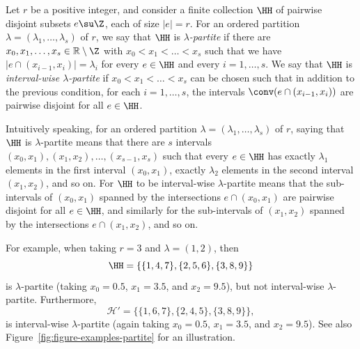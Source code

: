 \begin{definition}\label{def-s-partite}
    Let $r$ be a positive integer, and consider a finite collection $\HH$ of pairwise disjoint subsets $e\su \Z$, each of size $|e|=r$. For an ordered partition $\lambda=(\lambda_1,\dots,\lambda_s)$ of $r$, we say that $\HH$ is \emph{$\lambda$-partite} if there are $x_0,x_1,\dots,x_{s}\in\mathbb{R}\setminus\Z$ with $x_0<x_1<\dots<x_{s}$ such that we have $|e\cap (x_{i-1},x_i)|=\lambda_i$ for every $e\in \HH$ and every $i=1,\dots,s$. We say that $\HH$ is \emph{interval-wise $\lambda$-partite} if $x_0<x_1<\dots<x_{s}$ can be chosen such that in addition to the previous condition, for each $i=1,\dots,s$, the intervals $\conv(e\cap (x_{i-1},x_i))$  are pairwise disjoint for all $e\in \HH$.
\end{definition}

Intuitively speaking, for an ordered partition $\lambda=(\lambda_1,\dots,\lambda_s)$ of $r$, saying that $\HH$ is $\lambda$-partite means that there are $s$ intervals $(x_0,x_1),(x_1,x_2),\dots,(x_{s-1},x_s)$ such that every $e\in \HH$ has exactly $\lambda_1$ elements in the first interval $(x_0,x_1)$, exactly $\lambda_2$ elements in the second interval $(x_1,x_2)$, and so on. For $\HH$ to be interval-wise $\lambda$-partite means that the sub-intervals of $(x_0,x_1)$ spanned by the intersections $e\cap (x_0,x_1)$ are pairwise disjoint for all $e\in \HH$, and similarly for the sub-intervals of $(x_1,x_2)$ spanned by the intersections $e\cap (x_1,x_2)$, and so on.

For example, when taking $r=3$ and $\lambda=(1,2)$, then
\[
\HH = \{ \{1,4,7\}, \{2, 5,6\}, \{3,8,9\} \}
\]
is $\lambda$-partite (taking $x_0=0.5$, $x_1 = 3.5$, and $x_2 = 9.5$), but not interval-wise $\lambda$-partite. Furthermore,
\[
\mathcal H' = \{\{1,6,7\}, \{2, 4,5\}, \{3,8,9\}\},
\]
is interval-wise $\lambda$-partite (again taking $x_0=0.5$, $x_1 = 3.5$, and $x_2 = 9.5$). See also Figure~\ref{fig:figure-examples-partite} for an illustration.

